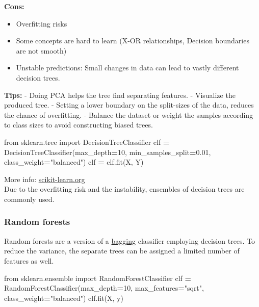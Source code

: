 \documentclass[
]{book}
\newenvironment{Shaded}{\begin{snugshade}}{\end{snugshade}}
\newcommand{\DecValTok}[1]{\textcolor[rgb]{0.00,0.00,0.81}{#1}}
\newcommand{\FloatTok}[1]{\textcolor[rgb]{0.00,0.00,0.81}{#1}}
\newcommand{\ImportTok}[1]{#1}
\newcommand{\NormalTok}[1]{#1}
\newcommand{\OperatorTok}[1]{\textcolor[rgb]{0.81,0.36,0.00}{\textbf{#1}}}
\newcommand{\StringTok}[1]{\textcolor[rgb]{0.31,0.60,0.02}{#1}}
\providecommand{\tightlist}{%
  \setlength{\itemsep}{0pt}\setlength{\parskip}{0pt}}
\begin{document}
\textbf{Cons:}

\begin{itemize}
\tightlist
\item
  Overfitting risks
\item
  Some concepts are hard to learn (X-OR relationships, Decision
  boundaries are not smooth)
\item
  Unstable predictions: Small changes in data can lead to vastly
  different decision trees.
\end{itemize}

\textbf{Tips:} - Doing PCA helps the tree find separating features. -
Visualize the produced tree. - Setting a lower boundary on the
split-sizes of the data, reduces the chance of overfitting. - Balance
the dataset or weight the samples according to class sizes to avoid
constructing biased trees.

\begin{Shaded}
\begin{Highlighting}[]
\ImportTok{from}\NormalTok{ sklearn.tree }\ImportTok{import}\NormalTok{ DecisionTreeClassifier}
\NormalTok{clf }\OperatorTok{=}\NormalTok{ DecisionTreeClassifier(max\_depth}\OperatorTok{=}\DecValTok{10}\NormalTok{, min\_samples\_split}\OperatorTok{=}\FloatTok{0.01}\NormalTok{, class\_weight}\OperatorTok{=}\StringTok{"balanced"}\NormalTok{)}
\NormalTok{clf }\OperatorTok{=}\NormalTok{ clf.fit(X, Y)}
\end{Highlighting}
\end{Shaded}

More info:
\href{https://scikit-learn.org/stable/modules/generated/sklearn.tree.DecisionTreeClassifier.html}{scikit-learn.org}\\

Due to the overfitting risk and the instability, ensembles of decision
trees are commonly used.

\hypertarget{random-forests}{%
\subsubsection{Random forests}\label{random-forests}}

Random forests are a version of a \protect\hyperlink{bagging}{bagging} classifier
employing decision trees. To reduce the variance, the separate trees can
be assigned a limited number of features as well.

\begin{Shaded}
\begin{Highlighting}[]
\ImportTok{from}\NormalTok{ sklearn.ensemble }\ImportTok{import}\NormalTok{ RandomForestClassifier}
\NormalTok{clf }\OperatorTok{=}\NormalTok{ RandomForestClassifier(max\_depth}\OperatorTok{=}\DecValTok{10}\NormalTok{, max\_features}\OperatorTok{=}\StringTok{"sqrt"}\NormalTok{, class\_weight}\OperatorTok{=}\StringTok{"balanced"}\NormalTok{)}
\NormalTok{clf.fit(X, y)}
\end{Highlighting}
\end{Shaded}
\end{document}
